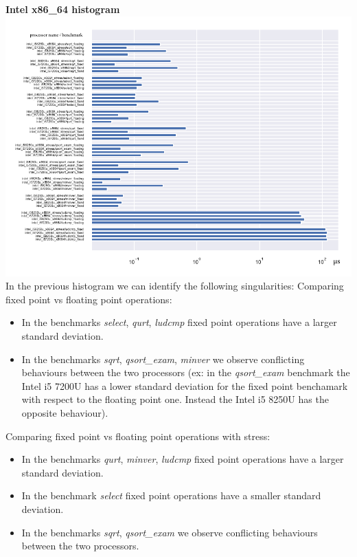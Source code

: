\textbf{Intel x86\_64 histogram}\newline
\hspace*{-3.2cm}
\includegraphics[width=570pt]{intel_histogram.pdf}
\clearpage
In the previous histogram we can identify the following singularities:
Comparing fixed point vs floating point operations:
\begin{itemize}
		\item In the benchmarks \textit{select}, \textit{qurt}, \textit{ludcmp} fixed point operations have a larger standard deviation.
		\item In the benchmarks \textit{sqrt}, \textit{qsort\_exam}, \textit{minver} we observe conflicting behaviours between the two processors (ex: in the \textit{qsort\_exam} benchmark the Intel i5 7200U has a lower standard deviation for the fixed point benchamark with respect to the floating point one. Instead the Intel i5 8250U has the opposite behaviour).
\end{itemize}
Comparing fixed point vs floating point operations with stress:
\begin{itemize}
		\item In the benchmarks \textit{qurt}, \textit{minver}, \textit{ludcmp} fixed point operations have a larger standard deviation.
		\item In the benchmark \textit{select} fixed point operations have a smaller standard deviation.
		\item In the benchmarks \textit{sqrt}, \textit{qsort\_exam} we observe conflicting behaviours between the two processors.
\end{itemize}

